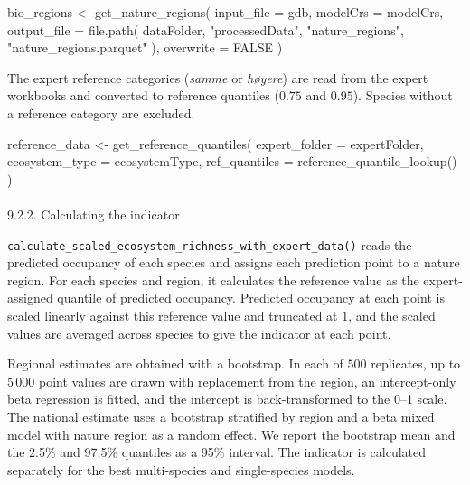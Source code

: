\documentclass[
  letterpaper,
  DIV=11,
  numbers=noendperiod]{scrartcl}
\makeatletter
\let\oldparagraph\paragraph
\renewcommand{\paragraph}{
    \@ifstar
      \xxxParagraphStar
      \xxxParagraphNoStar
  }
\newcommand{\xxxParagraphStar}[1]{\oldparagraph*{#1}\mbox{}}
\newcommand{\xxxParagraphNoStar}[1]{\oldparagraph{#1}\mbox{}}
\newenvironment{Shaded}{\begin{snugshade}}{\end{snugshade}}
\newcommand{\AttributeTok}[1]{\textcolor[rgb]{0.40,0.45,0.13}{#1}}
\newcommand{\ConstantTok}[1]{\textcolor[rgb]{0.56,0.35,0.01}{#1}}
\newcommand{\FunctionTok}[1]{\textcolor[rgb]{0.28,0.35,0.67}{#1}}
\newcommand{\NormalTok}[1]{\textcolor[rgb]{0.00,0.23,0.31}{#1}}
\newcommand{\OtherTok}[1]{\textcolor[rgb]{0.00,0.23,0.31}{#1}}
\newcommand{\StringTok}[1]{\textcolor[rgb]{0.13,0.47,0.30}{#1}}
\makeatother
\begin{document}
\begin{Shaded}
\begin{Highlighting}[]
\NormalTok{bio\_regions }\OtherTok{\textless{}{-}} \FunctionTok{get\_nature\_regions}\NormalTok{(}
  \AttributeTok{input\_file =}\NormalTok{ gdb,}
  \AttributeTok{modelCrs =}\NormalTok{ modelCrs,}
  \AttributeTok{output\_file =} \FunctionTok{file.path}\NormalTok{(}
\NormalTok{    dataFolder,}
    \StringTok{"processedData"}\NormalTok{,}
    \StringTok{"nature\_regions"}\NormalTok{,}
    \StringTok{"nature\_regions.parquet"}
\NormalTok{  ),}
  \AttributeTok{overwrite =} \ConstantTok{FALSE}
\NormalTok{)}
\end{Highlighting}
\end{Shaded}

The expert reference categories (\emph{samme} or \emph{høyere}) are read
from the expert workbooks and converted to reference quantiles (\(0.75\)
and \(0.95\)). Species without a reference category are excluded.

\begin{Shaded}
\begin{Highlighting}[]
\NormalTok{reference\_data }\OtherTok{\textless{}{-}} \FunctionTok{get\_reference\_quantiles}\NormalTok{(}
  \AttributeTok{expert\_folder =}\NormalTok{ expertFolder,}
  \AttributeTok{ecosystem\_type =}\NormalTok{ ecosystemType,}
  \AttributeTok{ref\_quantiles =} \FunctionTok{reference\_quantile\_lookup}\NormalTok{()}
\NormalTok{)}
\end{Highlighting}
\end{Shaded}

\paragraph{9.2.2. Calculating the
indicator}\label{calculating-the-indicator}

\texttt{calculate\_scaled\_ecosystem\_richness\_with\_expert\_data()}
reads the predicted occupancy of each species and assigns each
prediction point to a nature region. For each species and region, it
calculates the reference value as the expert-assigned quantile of
predicted occupancy. Predicted occupancy at each point is scaled
linearly against this reference value and truncated at \(1\), and the
scaled values are averaged across species to give the indicator at each
point.

Regional estimates are obtained with a bootstrap. In each of \(500\)
replicates, up to \(5\,000\) point values are drawn with replacement
from the region, an intercept-only beta regression is fitted, and the
intercept is back-transformed to the 0--1 scale. The national estimate
uses a bootstrap stratified by region and a beta mixed model with nature
region as a random effect. We report the bootstrap mean and the 2.5\%
and 97.5\% quantiles as a 95\% interval. The indicator is calculated
separately for the best multi-species and single-species models.
\end{document}
